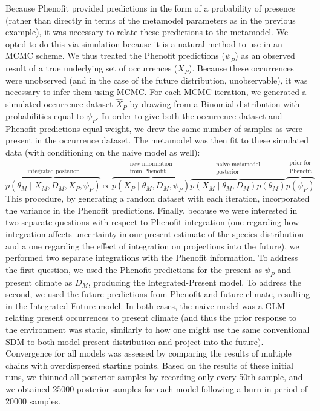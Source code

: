 \documentclass[11pt]{article}
\begin{document}
{Because Phenofit provided predictions in the form of a probability of presence (rather than directly in terms of the metamodel parameters as in the previous example), it was necessary to relate these predictions to the metamodel.
We opted to do this via simulation because it is a natural method to use in an MCMC scheme.
We thus treated the Phenofit predictions (\(\psi_P\)) as an observed result of a true underlying set of occurrences (\(X_P\)).
Because these occurrences were unobserved (and in the case of the future distribution, unobservable), it was necessary to infer them using MCMC.
For each MCMC iteration, we generated a simulated occurrence dataset \(\hat{X}_P\) by drawing from a Binomial distribution with probabilities equal to \(\psi_P\).
In order to give both the occurrence dataset and Phenofit predictions equal weight, we drew the same number of samples as were present in the occurrence dataset.
The metamodel was then fit to these simulated data (with conditioning on the naive model as well):
\begin{equation} 
\overbrace{p(\theta_M \mid X_M, D_M, X_P, \psi_P)}^\text{integrated posterior}
\propto
\overbrace{p\left (X_P \mid \theta_M,D_M,\psi_P \right )}^{\substack{\text{new information} \\ \text{from Phenofit}}}
\overbrace{p \left(X_M \mid \theta_M, D_M \right) p \left(\theta_M \right)}^{\substack{\text{naive metamodel} \\ \text{posterior}}}
\overbrace{p \left(\psi_P \right)}^{\substack{\text{prior for} \\ \text{Phenofit}}}	
\end{equation}
This procedure, by generating a random dataset with each iteration, incorporated the variance in the Phenofit predictions.
Finally, because we were interested in two separate questions with respect to Phenofit integration (one regarding how integration affects uncertainty in our present estimate of the species distribution and a one regarding the effect of integration on projections into the future), we performed two separate integrations with the Phenofit information.
To address the first question, we used the Phenofit predictions for the present as \(\psi_P\) and present climate as \(D_M\), producing the Integrated-Present model.
To address the second, we used the future predictions from Phenofit and future climate, resulting in the Integrated-Future model.
In both cases, the naive model was a GLM relating present occurrences to present climate (and thus the prior response to the environment was static, similarly to how one might use the same conventional SDM to both model present distribution and project into the future).
Convergence for all models was assessed by comparing the results of multiple chains with overdispersed starting points.
Based on the results of these initial runs, we thinned all posterior samples by recording only every 50th sample, and we obtained 25000 posterior samples for each model following a burn-in period of 20000 samples.}
\end{document}
